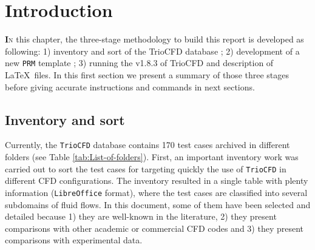 \chapter{Introduction}

\lettrine[lines=2,slope=0pt,nindent=4pt]{\textbf{I}}{n} this chapter,
the three-stage methodology to build this report is developed as following:
1) inventory and sort of the \textsf{TrioCFD} database ; 2) development of a
new \texttt{PRM} template ; 3) running the \textsf{v1.8.3} of \textsf{TrioCFD} and description of \LaTeX~files.
In this first section we present a summary of those three stages before
giving accurate instructions and commands in next sections.

\section{Inventory and sort}
Currently, the \texttt{TrioCFD} database contains 170 test
cases archived in different folders (see Table \ref{tab:List-of-folders}).
First, an important inventory work was carried out to sort the test
cases for targeting quickly the use of \texttt{TrioCFD} in different
CFD configurations. The inventory resulted in a single table with
plenty information (\texttt{LibreOffice} format), where the test cases
are classified into several subdomains of fluid flows. In this document,
some of them have been selected and detailed because 1) they are well-known
in the literature, 2) they present comparisons with other academic
or commercial CFD codes and 3) they present comparisons with experimental
data.

